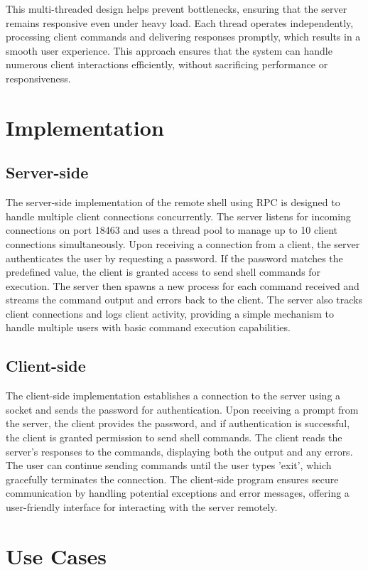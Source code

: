 \documentclass[12pt,a4paper]{report}
\begin{document}
This multi-threaded design helps prevent bottlenecks, ensuring that the server remains responsive even under heavy load. Each thread operates independently, processing client commands and delivering responses promptly, which results in a smooth user experience. This approach ensures that the system can handle numerous client interactions efficiently, without sacrificing performance or responsiveness.

\chapter{Implementation}
\section{Server-side}
The server-side implementation of the remote shell using RPC is designed to handle multiple client connections concurrently. The server listens for incoming connections on port 18463 and uses a thread pool to manage up to 10 client connections simultaneously. Upon receiving a connection from a client, the server authenticates the user by requesting a password. If the password matches the predefined value, the client is granted access to send shell commands for execution. The server then spawns a new process for each command received and streams the command output and errors back to the client. The server also tracks client connections and logs client activity, providing a simple mechanism to handle multiple users with basic command execution capabilities.

\section{Client-side}
The client-side implementation establishes a connection to the server using a socket and sends the password for authentication. Upon receiving a prompt from the server, the client provides the password, and if authentication is successful, the client is granted permission to send shell commands. The client reads the server's responses to the commands, displaying both the output and any errors. The user can continue sending commands until the user types 'exit', which gracefully terminates the connection. The client-side program ensures secure communication by handling potential exceptions and error messages, offering a user-friendly interface for interacting with the server remotely.

\chapter{Use Cases}
\end{document}
